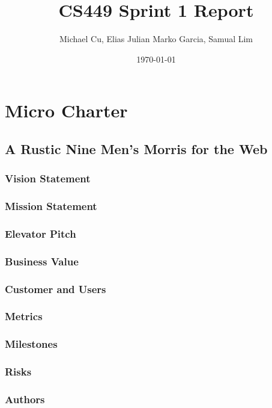 \documentclass[11pt]{article}
\author{Michael Cu, Elias Julian Marko Garcia, Samual Lim}
\date{\today}
\title{CS449 Sprint 1 Report}
\begin{document}
\maketitle
\tableofcontents

\section{Micro Charter}
\label{sec:orgf79c1b9}
\subsection{A Rustic Nine Men's Morris for the Web}
\label{sec:org69ab729}
\subsubsection*{Vision Statement}
\label{sec:org9e3f993}
\subsubsection*{Mission Statement}
\label{sec:org825a526}
\subsubsection*{Elevator Pitch}
\label{sec:orgf983bb0}
\subsubsection*{Business Value}
\label{sec:org2a59a76}
\subsubsection*{Customer and Users}
\label{sec:org52c6f30}
\subsubsection*{Metrics}
\label{sec:org5842ea8}
\subsubsection*{Milestones}
\label{sec:org6f46d9d}
\subsubsection*{Risks}
\label{sec:org48b1c7d}
\subsubsection*{Authors}
\label{sec:org6aaf19e}
\end{document}

